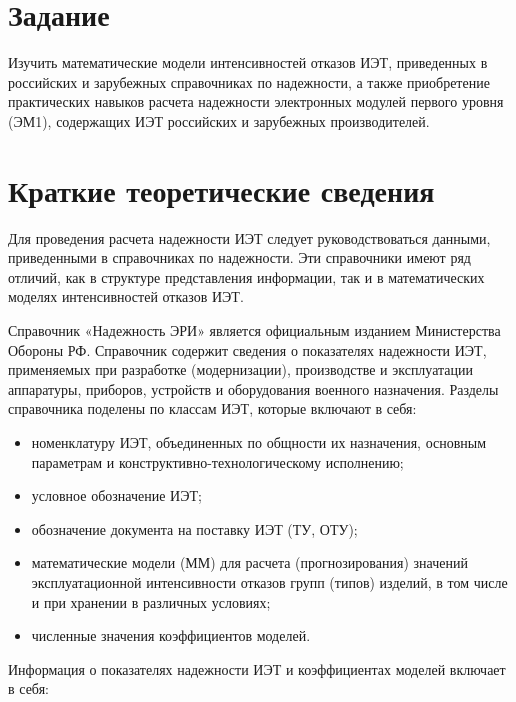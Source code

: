 \documentclass[a4paper,14pt]{article}
\begin{document}

\tableofcontents
\pagebreak

\section{Задание}

Изучить математические модели интенсивностей отказов ИЭТ, приведенных в российских и зарубежных справочниках по надежности, а также приобретение практических навыков расчета надежности электронных модулей первого уровня (ЭМ1), содержащих ИЭТ российских и зарубежных производителей.

\section{Краткие теоретические сведения}

Для проведения расчета надежности ИЭТ следует руководствоваться данными, приведенными в справочниках по надежности.
Эти справочники имеют ряд отличий, как в структуре представления информации, так и в математических моделях интенсивностей отказов ИЭТ.

Справочник «Надежность ЭРИ» является официальным изданием Министерства Обороны РФ.
Справочник содержит сведения о показателях надежности ИЭТ, применяемых при разработке (модернизации), производстве и эксплуатации аппаратуры, приборов, устройств и оборудования военного назначения.
Разделы справочника поделены по классам ИЭТ, которые включают в себя:

\begin{itemize}
	\item номенклатуру ИЭТ, объединенных по общности их назначения, основным параметрам и конструктивно-технологическому исполнению;
	
	\item условное обозначение ИЭТ;
	
	\item обозначение документа на поставку ИЭТ (ТУ, ОТУ);
	
	\item математические модели (ММ) для расчета (прогнозирования) значений эксплуатационной интенсивности отказов групп (типов) изделий, в том числе и при хранении в различных условиях;
	
	\item численные значения коэффициентов моделей.
\end{itemize}

Информация о показателях надежности ИЭТ и коэффициентах моделей включает в себя:
\end{document}
